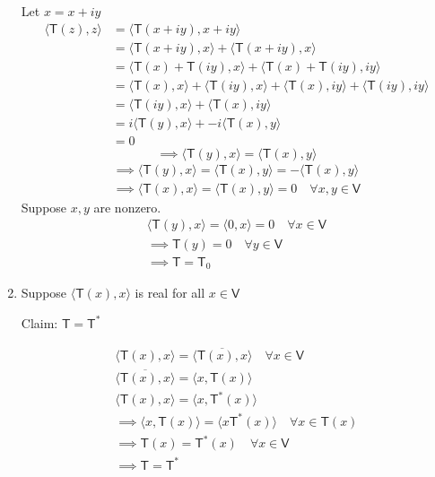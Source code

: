 \begin{enumerate}
Let $x = x + iy$
\begin{align}
\langle \mathsf{T}(z),z\rangle &= \langle \mathsf{T}(x+iy),x+iy\rangle
\\
&= \langle \mathsf{T}(x+iy),x\rangle + \langle
\mathsf{T}(x+iy),x\rangle\\
&= \langle\mathsf{T}(x)+\mathsf{T}(iy),x\rangle + \langle
\mathsf{T}(x)+\mathsf{T}(iy),iy\rangle \\
&= \langle \mathsf{T}(x),x \rangle + \langle \mathsf{T}(iy),x \rangle +
\langle \mathsf{T}(x),iy\rangle + \langle \mathsf{T}(iy),iy\rangle\\
&= \langle \mathsf{T}(iy),x \rangle + \langle \mathsf{T}(x),iy\rangle
\\
&= i\langle\mathsf{T}(y),x \rangle + -i\langle\mathsf{T}(x),y\rangle\\
&= 0
\end{align}
\begin{equation}
\implies \langle\mathsf{T}(y),x \rangle = \langle\mathsf{T}(x),y\rangle
\end{equation}
\begin{gather}
\implies \langle\mathsf{T}(y),x \rangle =
\langle\mathsf{T}(x),y\rangle = - \langle\mathsf{T}(x),y\rangle\\
\implies \langle \mathsf{T}(x),x \rangle = \langle
\mathsf{T}(x),y\rangle =0 \quad \forall x,y \in \mathsf{V}
\end{gather}
Suppose $x,y$ are nonzero.
\begin{gather}
\langle \mathsf{T}(y),x\rangle = \langle 0,x\rangle = 0 \quad \forall
x \in \mathsf{V}\\
\implies \mathsf{T}(y) = 0 \quad \forall y \in \mathsf{V}\\
\implies \mathsf{T} = \mathsf{T}_0
\end{gather}
\item Suppose $\langle \mathsf{T}(x),x \rangle$ is real for all $x \in
  \mathsf{V}$

Claim: $\mathsf{T} = \mathsf{T}^*$

\begin{gather}
\langle \mathsf{T}(x),x \rangle = \overline{\langle
  \mathsf{T}(x),x\rangle}\quad \forall x \in \mathsf{V}\\
\overline{\langle \mathsf{T}(x),x \rangle} = \langle
x,\mathsf{T}(x)\rangle\\
\langle \mathsf{T}(x),x\rangle = \langle x,\mathsf{T}^*(x)\rangle\\
\implies \langle x, \mathsf{T}(x)\rangle = \langle x
\mathsf{T}^*(x)\rangle \quad \forall x \in \mathsf{T}(x)\\
\implies \mathsf{T}(x) = \mathsf{T}^*(x) \quad \forall x \in
\mathsf{V}\\
\implies \mathsf{T} = \mathsf{T}^*
\end{gather}
\end{enumerate}
